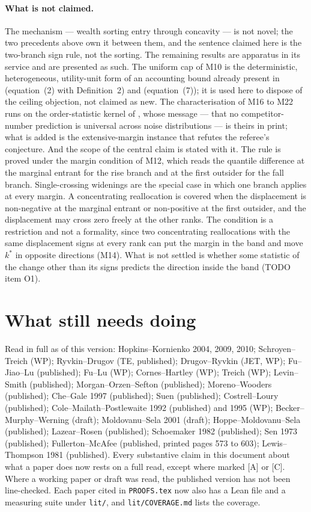 \documentclass[11pt,a4paper]{article}
\begin{document}
\paragraph{What is not claimed.} The mechanism --- wealth sorting entry
through concavity --- is not novel; the two precedents above own it between
them, and the sentence claimed here is the two-branch sign rule, not the
sorting. The remaining results are apparatus in its service and are
presented as such. The uniform cap of M10 is the deterministic,
heterogeneous, utility-unit form of an accounting bound already present in
\citet{FuJiaoLu2015} (equation~(2) with Definition~2) and \citet{FuLu2010}
(equation~(7)); it is used here to dispose of the ceiling objection, not
claimed as new. The characterisation of M16 to M22 runs on the
order-statistic kernel of \citet{RyvkinDrugov2020}, whose message --- that no
competitor-number prediction is universal across noise distributions --- is
theirs in print; what is added is the extensive-margin instance that refutes
the referee's conjecture. And the scope of the central claim is stated with
it. The rule is proved under the margin condition of
M12, which reads the quantile difference at the
marginal entrant for the rise branch and at the first outsider for the fall
branch. Single-crossing widenings are the special case in which one branch
applies at every margin. A concentrating reallocation is covered when the
displacement is
non-negative at the marginal entrant or non-positive at the first outsider, and
the displacement may cross zero freely at the other ranks. The condition is a
restriction and not a formality, since two concentrating reallocations with
the same displacement signs at every rank can put the margin in the band and move
$k^*$ in opposite directions (M14). What is not settled is
whether some statistic of the change other than its signs predicts the
direction inside the band (TODO item O1).


\section{What still needs doing}

Read in full as of this version: Hopkins--Kornienko 2004, 2009, 2010;
Schroyen--Treich (WP); Ryvkin--Drugov (TE, published); Drugov--Ryvkin (JET,
WP); Fu--Jiao--Lu (published); Fu--Lu (WP); Cornes--Hartley (WP); Treich
(WP); Levin--Smith (published); Morgan--Orzen--Sefton (published);
Moreno--Wooders (published); Che--Gale 1997 (published); Suen (published);
Costrell--Loury (published); Cole--Mailath--Postlewaite 1992 (published) and
1995 (WP); Becker--Murphy--Werning (draft); Moldovanu--Sela 2001 (draft);
Hoppe--Moldovanu--Sela (published); Lazear--Rosen (published); Schoemaker
1982 (published); Sen 1973 (published); Fullerton--McAfee (published,
printed pages 573 to 603); Lewis--Thompson 1981 (published). Every
substantive claim in this
document about what a paper does now rests on a full read, except where marked
[A] or [C]. Where a working paper or draft was read, the published version has
not been line-checked. Each paper cited in \texttt{PROOFS.tex} now also has
a Lean file and a measuring suite under
\texttt{lit/}, and \texttt{lit/COVERAGE.md} lists the coverage.
\end{document}
